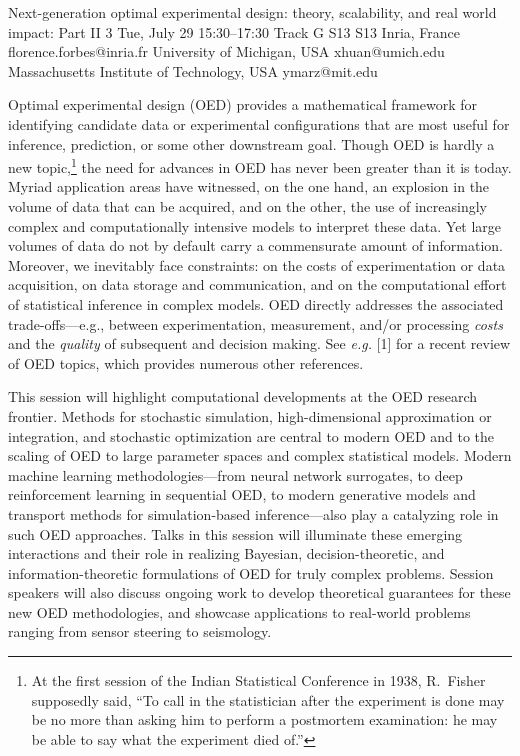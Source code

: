 \begin{talk}
  {Next-generation optimal experimental design: theory, scalability, and real world impact: Part II}%
  {3}%
  {}%
  {}%
  {}%
  {}%
  {Tue, July 29 15:30–17:30 Track G}%
  {S13}%
  {S13}%
  {%
    {Inria, France}%
    {florence.forbes@inria.fr}}%
  {%
	{University of Michigan, USA}%
	{xhuan@umich.edu}}%
  {%
	{Massachusetts Institute of Technology, USA}%
	{ymarz@mit.edu}}%


Optimal experimental design (OED) provides a mathematical framework for identifying candidate data or experimental configurations that are most useful for inference, prediction, or some other downstream goal. Though OED is hardly a new topic,\footnote{At the first session of the Indian Statistical Conference in 1938, R.\ Fisher supposedly said, ``To call in the statistician after the experiment is done may be no more than asking him to perform a postmortem examination: he may be able to say what the experiment died of.''} the need for advances in OED has never been greater than it is today. Myriad application areas have witnessed, on the one hand, an explosion in the volume of data that can be acquired, and on the other, the use of increasingly complex and computationally intensive models to interpret these data. Yet large volumes of data do not by default carry a commensurate amount of information. Moreover, we inevitably face constraints: on the costs of experimentation or data acquisition, on data storage and communication, and on the computational effort of statistical inference in complex models. OED directly addresses the associated trade-offs---e.g., between experimentation, measurement, and/or processing \textit{costs} and 
the \textit{quality} of subsequent and decision making. See {\it e.g.} [1] for a recent review of OED topics, which provides numerous other references.

This session will highlight computational developments at the OED research frontier. Methods for stochastic simulation, high-dimensional approximation or integration, and stochastic optimization are central to modern OED and to the scaling of OED to large parameter spaces and complex statistical models. Modern machine learning methodologies---from neural network surrogates, to deep reinforcement learning in sequential OED, to modern generative models and transport methods for simulation-based inference---also play a catalyzing role in such OED approaches. Talks in this session will illuminate these emerging interactions and their role in realizing Bayesian, decision-theoretic, and information-theoretic formulations of OED for truly complex problems. Session speakers will also discuss ongoing work to develop theoretical guarantees for these new OED methodologies, and showcase applications to real-world problems ranging from sensor steering to seismology.


\end{talk}
